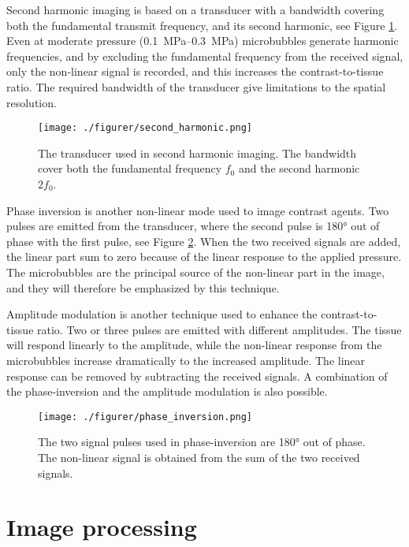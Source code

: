 Second harmonic imaging is based on a transducer with a bandwidth covering both the fundamental transmit frequency, and its second harmonic, see Figure \ref{Fig:Second harmonic}. Even at moderate pressure (\SIrange{0.1}{0.3}{\mega\pascal}) microbubbles generate harmonic frequencies, and by excluding the fundamental frequency from the received signal, only the non-linear signal is recorded, and this increases the contrast-to-tissue ratio. The required bandwidth of the transducer give limitations to the spatial resolution. 


\begin{figure}[h]
  \centering
  \label{Fig:Second harmonic}
  \texttt{[image: ./figurer/second\_harmonic.png]}
  \caption{The transducer used in second harmonic imaging. The bandwidth cover both the fundamental frequency $f_0$ and the second harmonic $2f_0$\cite{Hoskins2010}.}
\end{figure}
 
Phase inversion is another non-linear mode used to image contrast agents. Two pulses are emitted from the transducer, where the second pulse is \ang{180} out of phase with the first pulse, see Figure \ref{Fig:phase inversion}. When the two received signals are added, the linear part sum to zero because of the linear response to the applied pressure. The microbubbles are the principal source of the non-linear part in the image, and they will therefore be emphasized by this technique.

Amplitude modulation is another technique used to enhance the contrast-to-tissue ratio. Two or three pulses are emitted with different amplitudes. The tissue will respond linearly to the amplitude, while the non-linear response from the microbubbles increase dramatically to the increased amplitude. The linear response can be removed by subtracting the received signals. A combination of the phase-inversion and the amplitude modulation is also possible. 

\begin{figure}[h]
  \centering
  \label{Fig:phase inversion}
  \texttt{[image: ./figurer/phase\_inversion.png]}
  \caption{The two signal pulses used in phase-inversion are \ang{180} out of phase. The non-linear signal is obtained from the sum of the two received signals\cite{Hoskins2010}.}
\end{figure}



\section{Image processing}
